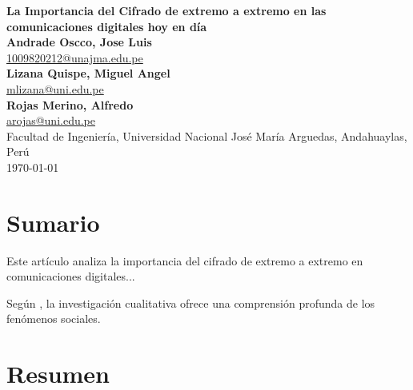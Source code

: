 \documentclass[spanish,12pt,a4paper]{article}
\begin{document}
	
	\begin{flushright}
		{\LARGE \textbf{La Importancia del Cifrado de extremo a extremo en las comunicaciones digitales hoy en día}}\\[1em]
		
		\textbf{Andrade Oscco, Jose Luis}~ \\
		\href{mailto:1009820212@unajma.edu.pe}{1009820212@unajma.edu.pe} \\[0.5em]
		
		\textbf{Lizana Quispe, Miguel Angel}~ \\
		\href{mailto:mlizana@uni.edu.pe}{mlizana@uni.edu.pe} \\[0.5em]
		
		\textbf{Rojas Merino, Alfredo}~ \\
		\href{mailto:arojas@uni.edu.pe}{arojas@uni.edu.pe} \\[0.5em]
		
		Facultad de Ingeniería, Universidad Nacional José María Arguedas, Andahuaylas, Perú \\
		\today
	\end{flushright}
	
	\vspace{2em} 
	
	

	\begin{multicols}{2}
		
		
		\section*{Sumario}
		Este artículo analiza la importancia del cifrado de extremo a extremo en comunicaciones digitales...
		
		Según \parencite{perez2020}, la investigación cualitativa ofrece una comprensión profunda de los fenómenos sociales.
		
		\section*{Resumen}

	\end{multicols}
	
	
	
	\printbibliography
	
\end{document}
